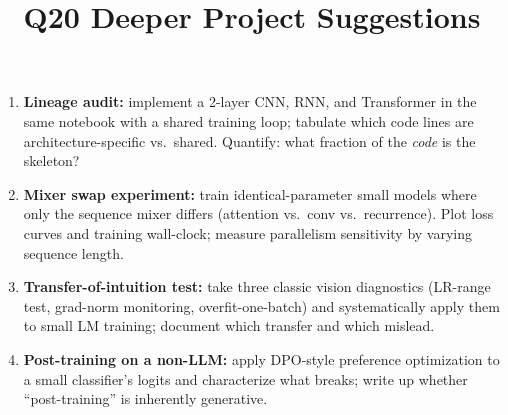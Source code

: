 \documentclass[11pt]{article}
\title{Q20 Deeper Project Suggestions}
\date{}
\begin{document}
\maketitle
\begin{enumerate}[noitemsep]
\item \textbf{Lineage audit:} implement a 2-layer CNN, RNN, and Transformer in the same notebook with a shared training loop; tabulate which code lines are architecture-specific vs.\ shared. Quantify: what fraction of the \emph{code} is the skeleton?
\item \textbf{Mixer swap experiment:} train identical-parameter small models where only the sequence mixer differs (attention vs.\ conv vs.\ recurrence). Plot loss curves and training wall-clock; measure parallelism sensitivity by varying sequence length.
\item \textbf{Transfer-of-intuition test:} take three classic vision diagnostics (LR-range test, grad-norm monitoring, overfit-one-batch) and systematically apply them to small LM training; document which transfer and which mislead.
\item \textbf{Post-training on a non-LLM:} apply DPO-style preference optimization to a small classifier's logits and characterize what breaks; write up whether ``post-training'' is inherently generative.
\end{enumerate}
\end{document}
